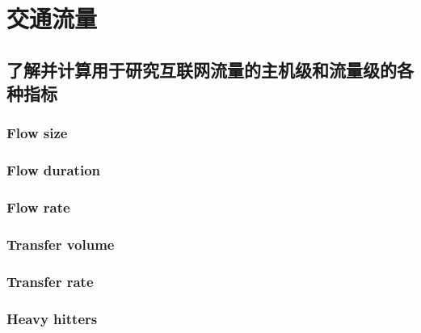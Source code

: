 \chapter{交通流量}

\section{了解并计算用于研究互联网流量的主机级和流量级的各种指标}

\subsection{Flow size}
\subsection{Flow duration}
\subsection{Flow rate}
\subsection{Transfer volume}
\subsection{Transfer rate}
\subsection{Heavy hitters}

